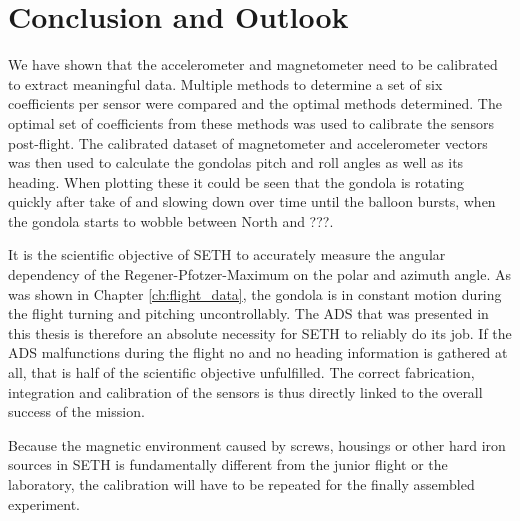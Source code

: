 \chapter{Conclusion and Outlook\label{ch:conclusion_outlook}}
We have shown that the accelerometer and magnetometer need to be calibrated to extract meaningful data. Multiple methods to determine a set of six coefficients per sensor were compared and the optimal methods determined. The optimal set of coefficients from these methods was used to calibrate the sensors post-flight. The calibrated dataset of magnetometer and accelerometer vectors was then used to calculate the gondolas pitch and roll angles as well as its heading. When plotting these it could be seen that the gondola is rotating quickly after take of and slowing down over time until the balloon bursts, when the gondola starts to wobble between North and ???.

It is the scientific objective of \ac{SETH} to accurately measure the angular dependency of the Regener-Pfotzer-Maximum on the polar and azimuth angle. As was shown in Chapter \ref{ch:flight_data}, the gondola is in constant motion during the flight turning and pitching uncontrollably. The \ac{ADS} that was presented in this thesis is therefore an absolute necessity for \ac{SETH} to reliably do its job. If the \ac{ADS} malfunctions during the flight no and no heading information is gathered at all, that is half of the scientific objective unfulfilled. The correct fabrication, integration and calibration of the sensors is thus directly linked to the overall success of the mission.
 

Because the magnetic environment caused by screws, housings or other hard iron sources in \ac{SETH} is fundamentally different from the junior flight or the laboratory, the calibration will have to be repeated for the finally assembled experiment.